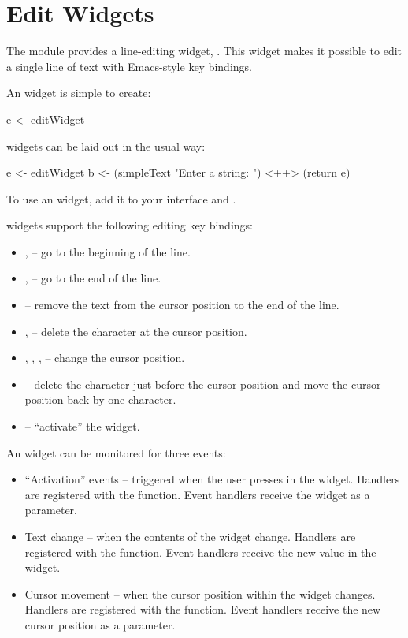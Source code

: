 \section{Edit Widgets}

The  module provides a line-editing widget, .
This widget makes it possible to edit a single line of text with
Emacs-style key bindings.

An  widget is simple to create:

\begin{haskellcode}
 e <- editWidget
\end{haskellcode}

 widgets can be laid out in the usual way:

\begin{haskellcode}
 e <- editWidget
 b <- (simpleText "Enter a string: ") <++> (return e)
\end{haskellcode}

To use an  widget, add it to your interface and
.

 widgets support the following editing key bindings:

\begin{itemize}
\item {},  -- go to the beginning of the line.
\item {},  -- go to the end of the line.
\item {} -- remove the text from the cursor position to the
  end of the line.
\item {},  -- delete the character at the cursor
  position.
\item {}, , ,  -- change the cursor
  position.
\item {} -- delete the character just before the cursor
  position and move the cursor position back by one character.
\item {} -- ``activate'' the  widget.
\end{itemize}

An  widget can be monitored for three events:

\begin{itemize}
\item ``Activation'' events -- triggered when the user presses
   in the  widget.  Handlers are registered with
  the  function.  Event handlers receive the 
  widget as a parameter.
\item Text change -- when the contents of the  widget change.
  Handlers are registered with the  function.  Event
  handlers receive the new  value in the  widget.
\item Cursor movement -- when the cursor position within the 
  widget changes.  Handlers are registered with the 
  function.  Event handlers receive the new cursor position as a
  parameter.
\end{itemize}

